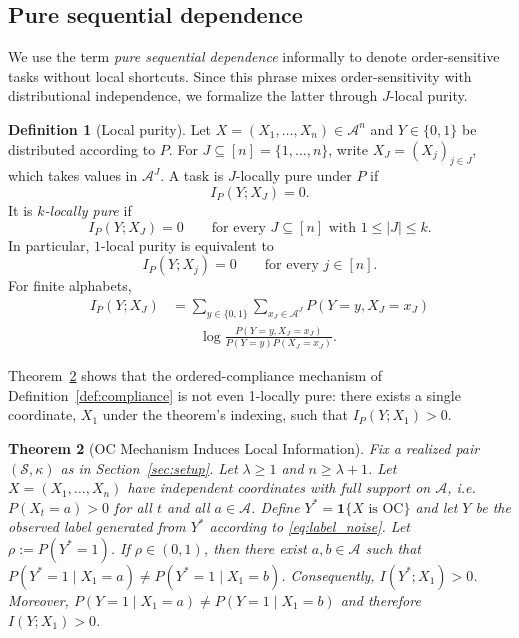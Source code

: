 \documentclass[fullpaper]{nldl}
\theoremstyle{plain}
\newtheorem{theorem}{Theorem}[section]
\theoremstyle{definition}
\newtheorem{definition}[theorem]{Definition}
\theoremstyle{remark}
\begin{document}
\subsection{Pure sequential dependence}
\label{sec:pure_sequential_def}
We use the term \emph{pure sequential dependence} informally to denote order-sensitive tasks without local shortcuts. Since this phrase mixes order-sensitivity with distributional independence, we formalize the latter through $J$-local purity.

\begin{definition}[Local purity]
\label{def:local_purity}
Let \(X=(X_1,\ldots,X_n)\in\mathcal A^n\) and \(Y\in\{0,1\}\)
be distributed according to \(P\). For \(J\subseteq [n] = \{1, \ldots, n\}\), write
\(X_J=(X_j)_{j\in J}\), which takes values in \(\mathcal A^J\).
A task is \(J\)-locally pure under \(P\) if
\[
I_P(Y;X_J)=0.
\]
It is \emph{\(k\)-locally pure} if
\[
I_P(Y;X_J)=0
\qquad
\text{for every } J\subseteq [n] \text{ with } 1\le |J|\le k.
\]
In particular, \(1\)-local purity is equivalent to
\[
I_P(Y;X_j)=0
\qquad
\text{for every } j\in[n].
\]
For finite alphabets,
\[
\begin{aligned}
I_P(Y;X_J)
&=
\sum_{y\in\{0,1\}}
\sum_{x_J\in\mathcal A^J}
P(Y=y,X_J=x_J)\\
&\qquad
\log
\frac{
P(Y=y,X_J=x_J)
}{
P(Y=y)P(X_J=x_J)
}.
\end{aligned}
\]
\end{definition}

Theorem~\ref{thm:impossibility} shows that the ordered-compliance mechanism of Definition~\ref{def:compliance} is not even 1-locally pure: there exists a single coordinate, $X_1$ under the theorem's indexing, such that $I_P(Y;X_1)>0$.

\begin{theorem}[OC Mechanism Induces Local Information]
\label{thm:impossibility}
Fix a realized pair $(\mathcal{S},\kappa)$ as in Section~\ref{sec:setup}.
Let $\lambda \ge 1$ and $n \ge \lambda+1$.
Let $X=(X_1,\ldots,X_n)$ have independent coordinates with full support on
$\mathcal{A}$, i.e.\ $P(X_t=a)>0$ for all $t$ and all $a\in\mathcal{A}$.
Define
$Y^* = \mathbf{1}\{X \text{ is OC}\}$ and let $Y$ be the observed label generated from $Y^*$ according to
\eqref{eq:label_noise}. Let $\rho := P(Y^*=1)$.
If $\rho\in(0,1)$, then there exist $a,b\in\mathcal{A}$ such that $P(Y^*=1\mid X_1=a)\neq P(Y^*=1\mid X_1=b)$.
Consequently, $I(Y^*;X_1)>0$. Moreover, $P(Y=1\mid X_1=a)\neq P(Y=1\mid X_1=b)$ and therefore $I(Y;X_1)>0$.
\end{theorem}
\end{document}
